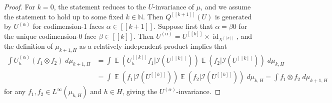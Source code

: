 \documentclass[11pt]{amsart}
\theoremstyle{definition}
\DeclareMathOperator*{\E}{\mathbb{E}}
\newcommand{\N}{{\mathbb N}}
\newcommand{\CI}{{\mathcal I}}
\newcommand{\cube}[1]{{[\![#1]\!]}}
\newcommand{\1}{{\mathbf{1}}}
\DeclareMathOperator{\Id}{id}
\begin{document}
\begin{proof}
    For $k=0$, the statement reduces to the $U$-invariance of $\mu$, and we assume the statement to hold up to some fixed $k\in\N$. Then $Q^\cube{k+1}(U)$ is generated by $U^{(\alpha)}$ for codimension-1 faces $\alpha\in\cube{k+1}$. Suppose first that $\alpha = \beta0$ for the unique codimension-0 face $\beta\in\cube{k}$. Then $U^{(\alpha)} = U^\cube{k}\times \Id_{X^\cube{k}}$, and the definition of $\mu_{k+1,H}$ as a relatively independent product implies that 
    \begin{align*}
        \int U_h^{(\alpha)}(f_1 \otimes f_2)\; d\mu_{k+1,H} &= \int \E(U_h^\cube{k}f_1|\CI(U^\cube{k}))\E(f_2|\CI(U^\cube{k}))\;d\mu_{k,H}\\
        &= \int \E(f_1|\CI(U^\cube{k}))\E(f_2|\CI(U^\cube{k}))\;d\mu_{k,H} = \int f_1\otimes f_2\; d\mu_{k+1,H}
    \end{align*}
    for any $f_1,f_2\in L^\infty(\mu_{k,H})$ and $h\in H$, giving the $U^{(\alpha)}$-invariance.


\end{proof}
\end{document}
